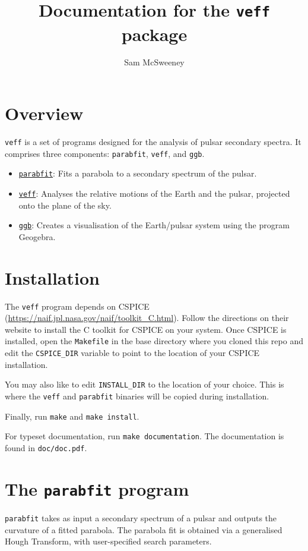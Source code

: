 \documentclass{article}
\title{Documentation for the \texttt{veff} package}
\author{Sam McSweeney}
\newcommand{\veff}{\texttt{veff}}
\newcommand{\parabfit}{\texttt{parabfit}}
\newcommand{\ggb}{\texttt{ggb}}
\begin{document}
\maketitle
\tableofcontents

\section{Overview}

\veff{} is a set of programs designed for the analysis of pulsar secondary spectra.
It comprises three components: \parabfit{}, \veff{}, and \ggb{}.
\begin{itemize}
    \item \underline{\parabfit}: Fits a parabola to a secondary spectrum of the pulsar.
    \item \underline{\veff}: Analyses the relative motions of the Earth and the pulsar, projected onto the plane of the sky.
    \item \underline{\ggb}: Creates a visualisation of the Earth/pulsar system using the program Geogebra.
\end{itemize}

\section{Installation}

The \veff{} program depends on CSPICE (\url{https://naif.jpl.nasa.gov/naif/toolkit_C.html}).
Follow the directions on their website to install the C toolkit for CSPICE on your system.
Once CSPICE is installed, open the \texttt{Makefile} in the base directory where you cloned this repo and edit the \texttt{CSPICE\_DIR} variable to point to the location of your CSPICE installation.

You may also like to edit \texttt{INSTALL\_DIR} to the location of your choice.
This is where the \veff{} and \parabfit{} binaries will be copied during installation.

Finally, run \texttt{make} and \texttt{make install}.

For typeset documentation, run \texttt{make documentation}.
The documentation is found in \texttt{doc/doc.pdf}.

\section{The \parabfit{} program}

\parabfit{} takes as input a secondary spectrum of a pulsar and outputs the curvature of a fitted parabola.
The parabola fit is obtained via a generalised Hough Transform, with user-specified search parameters.
\end{document}

